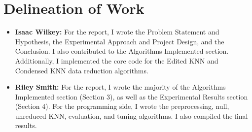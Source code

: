 \documentclass[twoside,11pt]{article}
\begin{document}
\section{Delineation of Work}
\begin{itemize}
    \item \textbf{Isaac Wilkey:} For the report, I wrote the Problem Statement and Hypothesis, the Experimental Approach and Project Design, and the Conclusion. I also contributed to the Algorithms Implemented section. Additionally, I implemented the core code for the Edited KNN and Condensed KNN data reduction algorithms.
    \item \textbf{Riley Smith:} For the report, I wrote the majority of the Algorithms Implemented section (Section 3), as well as the Experimental Results section (Section 4). For the programming side, I wrote the preprocessing, null, unreduced KNN, evaluation, and tuning algorithms. I also compiled the final results.
\end{itemize}
\end{document}
